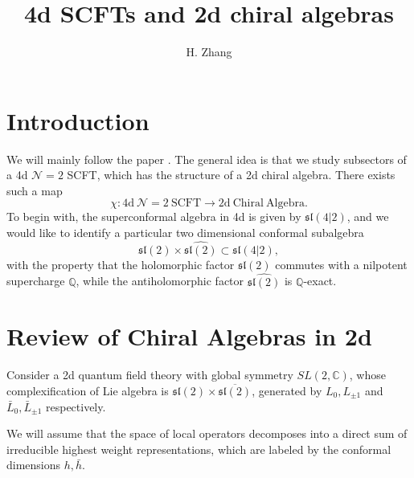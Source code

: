 \documentclass[a4paper,11pt]{article}
\title{\boldmath 4d SCFTs and 2d chiral algebras}
\author{H. Zhang}
\affiliation{Virginia Tech}
\begin{document}
\maketitle
\flushbottom

\section{Introduction}
We will mainly follow the paper \cite{Beem:2013sza}. The general idea is that we study subsectors of a 4d $\mathcal{N}=2$ SCFT, which has the structure of a 2d chiral algebra. There exists such a map
\begin{equation}
    \chi: \mathrm{4d}~\mathcal{N}=2~\mathrm{SCFT} \rightarrow \mathrm{2d~Chiral~Algebra}.
\end{equation}
To begin with, the superconformal algebra in 4d is given by $\mathfrak{sl}(4|2)$, and we would like to identify a particular two dimensional conformal subalgebra
\begin{equation}
    \mathfrak{sl}(2) \times \widehat{\mathfrak{sl}(2)} \subset \mathfrak{sl}(4|2),
\end{equation}
with the property that the holomorphic factor $\mathfrak{sl}(2)$ commutes with a nilpotent supercharge $\mathbb{Q}$, while the antiholomorphic factor $\widehat{\mathfrak{sl}(2)}$ is $\mathbb{Q}$-exact.

\section{Review of Chiral Algebras in 2d}
Consider a 2d quantum field theory with global symmetry $SL(2, \mathbb{C})$, whose complexification of Lie algebra is $\mathfrak{sl}(2) \times \overline{\mathfrak{sl}(2)}$, generated by $L_0, L_{\pm 1}$ and $\bar{L}_0, \bar{L}_{\pm 1}$ respectively.

We will assume that the space of local operators decomposes into a direct sum of irreducible highest weight representations, which are labeled by the conformal dimensions $h, \bar{h}$.
\end{document}
